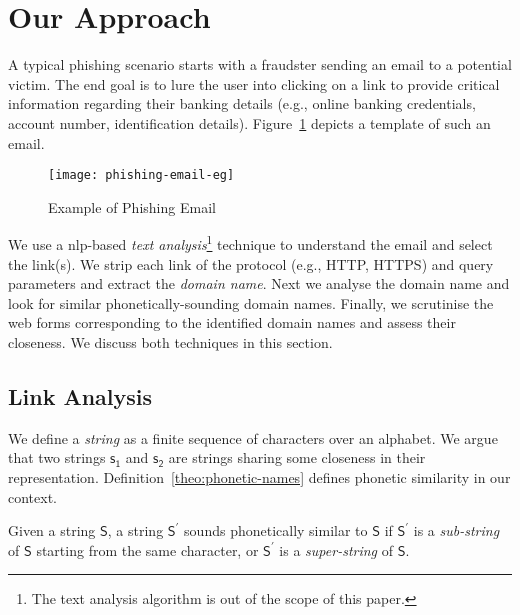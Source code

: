 \section{Our Approach} %
\label{sec:approach}

A typical phishing scenario starts with a fraudster sending an email to a potential victim. The end goal is to lure the user into clicking on a link to provide critical information regarding their banking details (e.g., online banking credentials, account number, identification details). Figure~\ref{fig:phishing-email} depicts a template of such an email.

\begin{figure}[hp!]
  \begin{center}
    \texttt{[image: phishing-email-eg]}
  \end{center}
  \caption{Example of Phishing Email}\label{fig:phishing-email}
\end{figure}

We use a \gls{nlp}-based \emph{text analysis}\footnote{The text analysis algorithm is out of the scope of this paper.}  technique to understand the email and select the link(s). We strip each link of the protocol (e.g., HTTP, HTTPS) and query parameters and extract the \emph{domain name}. Next we analyse the domain name and look for similar phonetically-sounding domain names. Finally, we scrutinise the web forms corresponding to the identified domain names and assess their closeness. We discuss both techniques in this section.

\subsection{Link Analysis} %
\label{sub:approach-link-analysis}

We define a \emph{string} as a finite sequence of characters over an alphabet. We argue that two strings $\mathsf{s_1}$ and $\mathsf{s_2}$ are strings sharing some closeness in their representation. Definition~\ref{theo:phonetic-names} defines phonetic similarity in our context.  

\begin{definition}
  \label{theo:phonetic-names}
  Given a string $\mathsf{S}$, a string $\mathsf{S^\prime}$ sounds phonetically similar to $\mathsf{S}$ if  $\mathsf{S^\prime}$ is a \emph{sub-string} of $\mathsf{S}$ starting from the same character, or $\mathsf{S^\prime}$ is a \emph{super-string} of $\mathsf{S}$.  
\end{definition}

